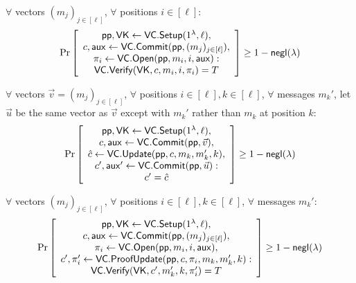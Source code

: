\begin{definition}
$\forall$ vectors $(m_j)_{j\in [\ell]}$, $\forall$ positions $i\in[\ell]$:
\begin{align*}
\Pr \left[ \begin{array}{c}
\mathsf{pp},\mathsf{VK} \leftarrow \mathsf{VC.Setup}(1^\lambda, \ell), \\
c,\mathsf{aux}\leftarrow \mathsf{VC.Commit}(\mathsf{pp}, (m_j)_{j\in [\ell]}),\\
\pi_i \leftarrow \mathsf{VC.Open}(\mathsf{pp}, m_i, i, \mathsf{aux}):\\
\mathsf{VC.Verify}(\mathsf{VK}, c, m_i, i, \pi_i) = T
\end{array} \right] \ge 1 - \mathsf{negl}(\lambda)
\end{align*}
\end{definition}

\begin{definition}
$\forall$ vectors $\vec{v}=(m_j)_{j\in [\ell]}$, $\forall$ positions $i\in[\ell],k\in[\ell]$, $\forall$ messages $m_k'$, let $\vec{u}$ be the same vector as $\vec{v}$ except with $m_k'$ rather than $m_k$ at position $k$:
\begin{align*}
\Pr \left[ \begin{array}{c}
\mathsf{pp},\mathsf{VK} \leftarrow \mathsf{VC.Setup}(1^\lambda, \ell), \\
c, \mathsf{aux}\leftarrow \mathsf{VC.Commit}(\mathsf{pp}, \vec{v}),\\
\hat{c}\leftarrow \mathsf{VC.Update}(\mathsf{pp}, c, m_k, m_k', k),\\
c', \mathsf{aux'}\leftarrow \mathsf{VC.Commit}(\mathsf{pp}, \vec{u}):\\
c' = \hat{c}
\end{array} \right] \ge 1 - \mathsf{negl}(\lambda)
\end{align*}
\end{definition}

\begin{definition}
$\forall$ vectors $(m_j)_{j\in [\ell]}$, $\forall$ positions $i\in[\ell],k\in[\ell]$, $\forall$ messages $m_k'$:
\begin{align*}
\Pr \left[ \begin{array}{c}
\mathsf{pp},\mathsf{VK} \leftarrow \mathsf{VC.Setup}(1^\lambda, \ell), \\
c,\mathsf{aux}\leftarrow \mathsf{VC.Commit}(\mathsf{pp}, (m_j)_{j\in [\ell]}),\\
\pi_i \leftarrow \mathsf{VC.Open}(\mathsf{pp}, m_i, i,\mathsf{aux}),\\
c', \pi'_i \leftarrow \mathsf{VC.ProofUpdate}(\mathsf{pp}, c, \pi_i, m_k, m_k', k):\\
\mathsf{VC.Verify}(\mathsf{VK}, c', m_k', k, \pi'_i) = T
\end{array} \right] \ge 1 - \mathsf{negl}(\lambda)
\end{align*}
\end{definition}

